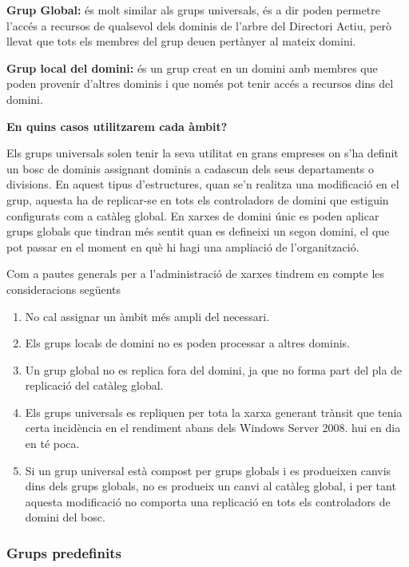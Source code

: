 \documentclass[
  a4paper,
]{article}
\begin{document}
\textbf{Grup Global:} és molt similar als grups universals, és a dir
poden permetre l'accés a recursos de qualsevol dels dominis de l'arbre
del Directori Actiu, però llevat que tots els membres del grup deuen
pertànyer al mateix domini.

\textbf{Grup local del domini:} és un grup creat en un domini amb
membres que poden provenir d'altres dominis i que només pot tenir accés
a recursos dins del domini.

\textbf{En quins casos utilitzarem cada àmbit?}

Els grups universals solen tenir la seva utilitat en grans empreses on
s'ha definit un bosc de dominis assignant dominis a cadascun dels seus
departaments o divisions. En aquest tipus d'estructures, quan se'n
realitza una modificació en el grup, aquesta ha de replicar-se en tots
els controladors de domini que estiguin configurats com a catàleg
global. En xarxes de domini únic es poden aplicar grups globals que
tindran més sentit quan es defineixi un segon domini, el que pot passar
en el moment en què hi hagi una ampliació de l'organització.

Com a pautes generals per a l'administració de xarxes tindrem en compte
les consideracions següents

\begin{enumerate}
\def\labelenumi{\arabic{enumi}.}
\item
  No cal assignar un àmbit més ampli del necessari.
\item
  Els grups locals de domini no es poden processar a altres dominis.
\item
  Un grup global no es replica fora del domini, ja que no forma part del
  pla de replicació del catàleg global.
\item
  Els grups universals es repliquen per tota la xarxa generant trànsit
  que tenia certa incidència en el rendiment abans dels Windows Server
  2008. hui en dia en té poca.
\item
  Si un grup universal està compost per grups globals i es produeixen
  canvis dins dels grups globals, no es produeix un canvi al catàleg
  global, i per tant aquesta modificació no comporta una replicació en
  tots els controladors de domini del bosc.
\end{enumerate}

\subsubsection{Grups predefinits}\label{grups-predefinits}
\end{document}
